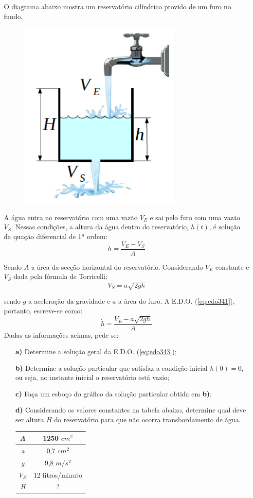 \linespread{1.5}
O diagrama abaixo mostra um reservatório cilíndrico provido de um furo no fundo.
\begin{figure}[H]
    \centering
    \includegraphics[width=0.3\linewidth]{fig/edo34}
\end{figure}
A água entra no reservatório com uma vazão $V_E$ e sai pelo furo com uma vazão $V_S$. Nessas condições, a altura da água dentro do reservatório, $h(t)$, é solução da quação diferencial de 1ª ordem:
\begin{equation}
    \label{eq:edo341}
    \Dot{h} = \frac{V_E - V_S}{A}
\end{equation}

Sendo $A$ a área da secção horizontal do reservatório. Considerando $V_E$ constante e $V_S$ dada pela fórmula de Torricelli:
\begin{equation}
    \label{eq:342}
    V_S = a\sqrt{2gh}
\end{equation}

sendo $g$ a aceleração da gravidade e $a$ a área do furo. A E.D.O. (\ref{eq:edo341}), portanto, escreve-se como:
\begin{equation}
    \label{eq:edo343}
    \Dot{h} = \frac{V_E - a\sqrt{2gh}}{A}
\end{equation} 
Dadas as informações acimas, pede-se:
\begin{itemize}
    \item[\textbf{a)}] Determine a solução geral da E.D.O. (\ref{eq:edo343});
    \item[\textbf{b)}]Determine a solução particular que satisfaz a condição inicial $h(0) = 0$, ou seja, no instante inicial o reservatório está vazio;
    \item[\textbf{c)}] Faça um esboço do gráfico da solução particular obtida em \textbf{b)};
    \item[\textbf{d)}]Considerando os valores constantes na tabela abaixo, determine qual deve ser altura $H$ do reservatório para que não ocorra transbordamento de água.
    \begin{table}[H]
    \centering
    \begin{tabular}{|c|c|}
    \hline
    \textit{A}     & 1250 $cm^2$      \\ \hline
    \textit{a}     & 0,7 $cm^2$       \\ \hline
    \textit{g}     & 9,8 $m/s^2$      \\ \hline
    \textit{$V_E$} & 12 litros/minuto \\ \hline
    \textit{H}     & ?                \\ \hline
    \end{tabular}
    \end{table}
\end{itemize}
